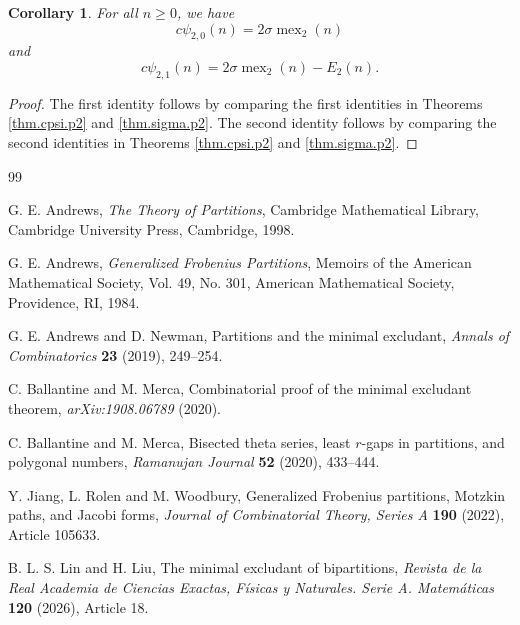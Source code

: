 \documentclass[12pt]{amsart}
\newtheorem{cor}[theorem]{Corollary}
\theoremstyle{definition}
\theoremstyle{remark}
\numberwithin{equation}{section}
\newcommand{\mex}{\operatorname{mex}}
\newcommand{\cpsi}{c\psi}
\begin{document}
\begin{cor}\label{cor.main.identities}
For all $n\geq 0$, we have
\[
\cpsi_{2,0}(n)=2\sigma\mex_2(n)
\]
and
\[
\cpsi_{2,1}(n)=2\sigma\mex_2(n)-E_2(n).
\]
\end{cor}

\begin{proof}
The first identity follows by comparing the first identities in Theorems \ref{thm.cpsi.p2} and \ref{thm.sigma.p2}.  The second identity follows by comparing the second identities in Theorems \ref{thm.cpsi.p2} and \ref{thm.sigma.p2}.
\end{proof}

\begin{thebibliography}{99}

G. E. Andrews, \textit{The Theory of Partitions}, Cambridge Mathematical Library, Cambridge University Press, Cambridge, 1998.

G. E. Andrews, \textit{Generalized Frobenius Partitions}, Memoirs of the American Mathematical Society, Vol. 49, No. 301, American Mathematical Society, Providence, RI, 1984.

G. E. Andrews and D. Newman, Partitions and the minimal excludant, \textit{Annals of Combinatorics} \textbf{23} (2019), 249--254.

C. Ballantine and M. Merca, Combinatorial proof of the minimal excludant theorem, \textit{arXiv:1908.06789} (2020).

C. Ballantine and M. Merca, Bisected theta series, least $r$-gaps in partitions, and polygonal numbers, \textit{Ramanujan Journal} \textbf{52} (2020), 433--444.

Y. Jiang, L. Rolen and M. Woodbury, Generalized Frobenius partitions, Motzkin paths, and Jacobi forms, \textit{Journal of Combinatorial Theory, Series A} \textbf{190} (2022), Article 105633.

B. L. S. Lin and H. Liu, The minimal excludant of bipartitions, \textit{Revista de la Real Academia de Ciencias Exactas, F\'{i}sicas y Naturales. Serie A. Matem\'{a}ticas} \textbf{120} (2026), Article 18.

\end{thebibliography}
\end{document}
